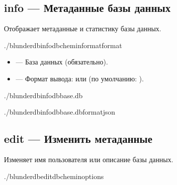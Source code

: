 \documentclass[letterpaper,10pt,russian]{sphinxmanual}
\begin{document}
\subsection{info — Метаданные базы данных}
\label{\detokenize{cli:info-metadonnees-de-la-base}}
\sphinxAtStartPar
Отображает метаданные и статистику базы данных.

\begin{sphinxVerbatim}[commandchars=\\\{\}]
./blunderdbinfo\PYGZhy{}\PYGZhy{}db\PYGZlt{}chemin\PYGZgt{}\PYG{o}{[}\PYGZhy{}\PYGZhy{}format\PYGZlt{}format\PYGZgt{}\PYG{o}{]}
\end{sphinxVerbatim}

\sphinxAtStartPar
{}
\begin{itemize}
\item {} 
\sphinxAtStartPar
{} — База данных (обязательно).

\item {} 
\sphinxAtStartPar
{} — Формат вывода:  или  (по умолчанию: ).

\end{itemize}

\sphinxAtStartPar
{}

\begin{sphinxVerbatim}[commandchars=\\\{\}]
./blunderdbinfo\PYGZhy{}\PYGZhy{}dbbase.db

./blunderdbinfo\PYGZhy{}\PYGZhy{}dbbase.db\PYGZhy{}\PYGZhy{}formatjson
\end{sphinxVerbatim}


\subsection{edit — Изменить метаданные}
\label{\detokenize{cli:edit-modifier-les-metadonnees}}
\sphinxAtStartPar
Изменяет имя пользователя или описание базы данных.

\begin{sphinxVerbatim}[commandchars=\\\{\}]
./blunderdbedit\PYGZhy{}\PYGZhy{}db\PYGZlt{}chemin\PYGZgt{}\PYG{o}{[}options\PYG{o}{]}
\end{sphinxVerbatim}
\end{document}
